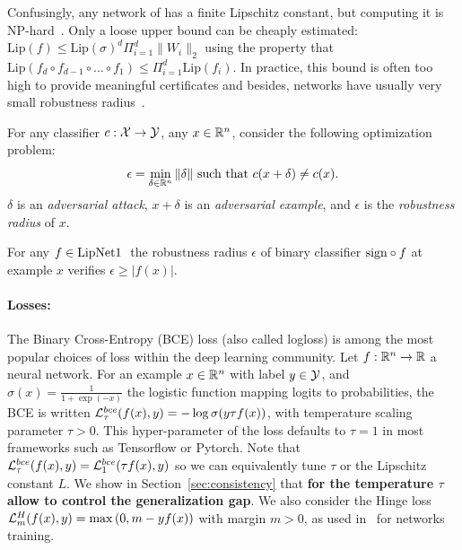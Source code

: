   Confusingly, any network of \LipInf has a finite Lipschitz constant, but computing it is NP-hard~\cite{scaman2018lipschitz}. Only a loose upper bound can be cheaply estimated: $\text{Lip}(f)\leq \text{Lip}(\sigma)^d\Pi_{i=1}^d \|W_i\|_2$ using the property that $\text{Lip}(f_d\circ f_{d-1}\circ\ldots \circ f_1)\leq\Pi_{i=1}^d\text{Lip}(f_i)$. In practice, this bound is often too high to provide meaningful certificates and besides, \LipInf networks have usually very small robustness radius~\cite{szegedy2013intriguing}.  
      
    \begin{definition} %
        For any classifier $c:\mathcal{X}\rightarrow\mathcal{Y}$, any $x\in\mathbb{R}^n$, consider the following optimization problem:
        \begin{equation}
            \epsilon=\min_{\delta\in\mathbb{R}^n} \|\delta\|\text{ such that }c(x+\delta)\neq c(x).
        \end{equation}  
        $\delta$ is an \textit{adversarial attack}, $x+\delta$ is an \textit{adversarial example}, and $\epsilon$ is the \textit{robustness radius} of $x$. %
    \end{definition}  
      
    \begin{property}\label{thm:certificates}
        For any $f\in\text{LipNet1 }$ the robustness radius $\epsilon$ of binary classifier $\text{sign}\circ f$ at example $x$ verifies $\epsilon\geq|f(x)|$.
    \end{property} %
  
\paragraph{Losses:} The Binary Cross-Entropy (BCE) loss (also called logloss) is among the most popular choices of loss within the deep learning community. Let $f:\mathbb{R}^n\rightarrow\mathbb{R}$ a neural network. For an example $x\in\mathbb{R}^n$ with label $y\in\mathcal{Y}$, and $\sigma(x)=\frac{1}{1+\exp{(-x)}}$ the logistic function mapping logits to probabilities, the BCE is written $\mathcal{L}^{bce}_{\tau}(f(x),y)=-\log{\sigma(y\tau f(x))}$, with temperature scaling parameter $\tau>0$. This hyper-parameter of the loss defaults to $\tau=1$ in most frameworks such as Tensorflow or Pytorch. Note that $\mathcal{L}^{bce}_{\tau}(f(x),y)=\mathcal{L}^{bce}_{1}(\tau f(x),y)$ so we can equivalently tune $\tau$ or the Lipschitz constant $L$. We show in Section~\ref{sec:consistency} that \textbf{for \LipCl the temperature $\tau$ allow to control the generalization gap}. We also consider the Hinge loss $\mathcal{L}^{H}_{m}(f(x),y)=\max{(0, m-yf(x))}$ with margin $m>0$, as used in~\cite{li2019preventing} for \LipCl networks training.

